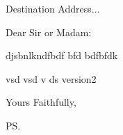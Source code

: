 \documentclass{letter}
\begin{document}
\begin{letter}{Destination Address...}
\opening{Dear Sir or Madam:}

djsbnlkndfbdf
bfd
bdfbfdk

vsd
vsd
v
ds
version2


\closing{Yours Faithfully,}
\ps



\end{letter}
\end{document}
